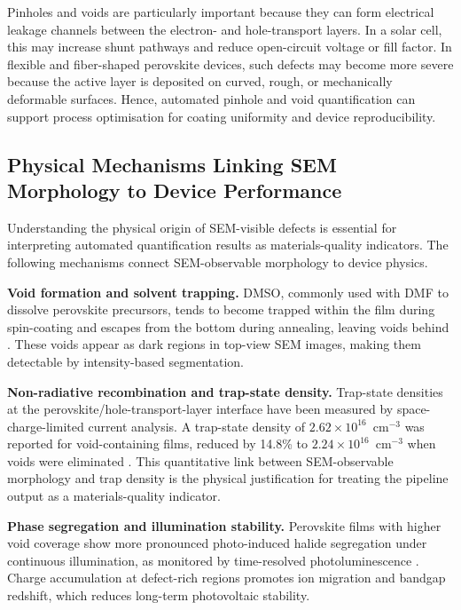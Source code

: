 \documentclass[pdflatex,sn-mathphys-num,iicol]{sn-jnl}
\theoremstyle{thmstyleone}
\theoremstyle{thmstyletwo}
\theoremstyle{thmstylethree}
\begin{document}
Pinholes and voids are particularly important because they can form
electrical leakage channels between the electron- and hole-transport
layers. In a solar cell, this may increase shunt pathways and reduce
open-circuit voltage or fill factor. In flexible and fiber-shaped
perovskite devices, such defects may become more severe because the
active layer is deposited on curved, rough, or mechanically
deformable surfaces. Hence, automated pinhole and void quantification
can support process optimisation for coating uniformity and device
reproducibility.

\subsection{Physical Mechanisms Linking SEM Morphology to Device Performance}
\label{subsec:physical_mechanisms}

Understanding the physical origin of SEM-visible defects is essential
for interpreting automated quantification results as materials-quality
indicators. The following mechanisms connect SEM-observable
morphology to device physics.

\textbf{Void formation and solvent trapping.}
DMSO, commonly used with DMF to dissolve perovskite precursors, tends
to become trapped within the film during spin-coating and escapes from
the bottom during annealing, leaving voids behind
\cite{chang2026,chen2021}. These voids appear as dark regions in
top-view SEM images, making them detectable by intensity-based
segmentation.

\textbf{Non-radiative recombination and trap-state density.}
Trap-state densities at the perovskite/hole-transport-layer interface
have been measured by space-charge-limited current analysis. A
trap-state density of $2.62 \times 10^{16}$~cm$^{-3}$ was reported
for void-containing films, reduced by 14.8\% to
$2.24 \times 10^{16}$~cm$^{-3}$ when voids were eliminated
\cite{chang2026}. This quantitative link between SEM-observable
morphology and trap density is the physical justification for
treating the pipeline output as a materials-quality indicator.

\textbf{Phase segregation and illumination stability.}
Perovskite films with higher void coverage show more pronounced
photo-induced halide segregation under continuous illumination,
as monitored by time-resolved photoluminescence \cite{chang2026}.
Charge accumulation at defect-rich regions promotes ion migration
and bandgap redshift, which reduces long-term photovoltaic stability.
\end{document}
